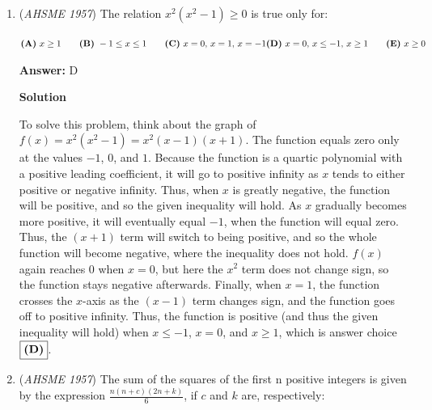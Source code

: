 \begin{enumerate}
 $\textbf{(A)}\ \text{dependent upon }{b} \qquad \textbf{(B)}\ \text{dependent upon }{a}\qquad \textbf{(C)}\ \text{dependent upon }{a}\text{ and }{b}\qquad\textbf{(D)}\ \text{zero}\qquad\textbf{(E)}\ \text{one}$

 \textbf{Answer: }B



\textbf{Solution}

By the fact that logarithms are the \href{https://artofproblemsolving.com/wiki/index.php?title=Inverse\_of\_a\_function}{inverse} of exponentiation, it is clear that $b^{log_b{a}}=a$, so our answer is $\boxed{\textbf{(B)}\text{ dependent upon }a}$.

 


	\item (\textit{AHSME 1957}) The relation $x^2(x^2 - 1)\ge 0$ is true only for: 


 $\textbf{(A)}\ x \ge 1\qquad \textbf{(B)}\ - 1 \le x \le 1\qquad \textbf{(C)}\ x = 0,\, x = 1,\, x = - 1\qquad \\\textbf{(D)}\ x = 0,\, x\le-1,\, x\ge 1\qquad\textbf{(E)}\ x\ge 0$

 \textbf{Answer: }D



\textbf{Solution}

To solve this problem, think about the graph of $f(x)=x^2(x^2-1)=x^2(x-1)(x+1)$. The function equals zero only at the values $-1$, $0$, and $1$. Because the function is a quartic polynomial with a positive leading coefficient, it will go to positive infinity as $x$ tends to either positive or negative infinity. Thus, when $x$ is greatly negative, the function will be positive, and so the given inequality will hold. As $x$ gradually becomes more positive, it will eventually equal $-1$, when the function will equal zero. Thus, the $(x+1)$ term will switch to being positive, and so the whole function will become negative, where the inequality does not hold. $f(x)$ again reaches $0$ when $x=0$, but here the $x^2$ term does not change sign, so the function stays negative afterwards. Finally, when $x=1$, the function crosses the $x$-axis as the $(x-1)$ term changes sign, and the function goes off to positive infinity. Thus, the function is positive (and thus the given inequality will hold) when $x \leq -1$, $x=0$, and $x \geq 1$, which is answer choice $\fbox{\textbf{(D)}}$.

 


	\item (\textit{AHSME 1957}) The sum of the squares of the first n positive integers is given by the expression $\frac{n(n + c)(2n + k)}{6}$, 
if $c$ and $k$ are, respectively: 



\end{enumerate}
